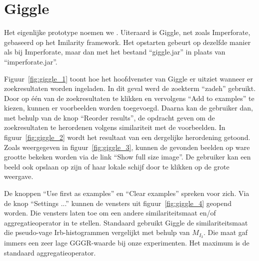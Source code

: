 \section{Giggle}

Het eigenlijke prototype noemen we . Uiteraard is Giggle, net zoals
Imperforate, gebaseerd op het Imilarity framework. Het opstarten gebeurt
op dezelfde manier als bij Imperforate, maar dan met het bestand ``giggle.jar''
in plaats van ``imperforate.jar''.

Figuur~\ref{fig:giggle_1} toont
hoe het hoofdvenster van Giggle er uitziet wanneer er zoekresultaten worden
ingeladen. In dit geval werd de zoekterm ``zadeh'' gebruikt. 
Door op \'e\'en van
de zoekresultaten te klikken en vervolgens ``Add to examples'' te kiezen,
kunnen er voorbeelden worden toegevoegd. Daarna kan de gebruiker dan, met behulp 
van de knop ``Reorder results'', de opdracht geven om de zoekresultaten te herordenen 
volgens similariteit met de voorbeelden. In figuur~\ref{fig:giggle_2} wordt het
resultaat van een dergelijke herordening getoond. Zoals weergegeven in
figuur~\ref{fig:giggle_3}, kunnen de gevonden beelden op ware grootte bekeken worden via de link 
``Show full size image''. De gebruiker kan een beeld ook opslaan op zijn of haar 
lokale schijf door te klikken op de grote weergave.

De knoppen ``Use first as examples'' en ``Clear examples'' spreken voor zich. Via
de knop ``Settings ...'' kunnen de vensters uit figuur~\ref{fig:giggle_4}
geopend worden. Die vensters laten toe om een andere similariteitsmaat en/of
aggregatieoperator in te stellen. Standaard gebruikt Giggle de similariteitsmaat 
die pseudo-vage Irb-histogrammen vergelijkt met behulp van $M_{I_3}$. 
Die maat gaf immers een zeer lage GGGR-waarde bij onze experimenten. Het maximum is
de standaard aggregatieoperator.

